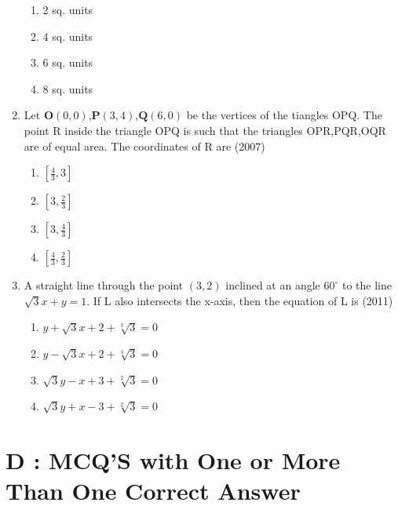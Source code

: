 \documentclass[12pt]{article}
\let\vec\mathbf
\begin{document}
\begin{enumerate}
\begin{enumerate}
\item 2 sq. units  
\item 4 sq. units 
\item 6 sq. units    
\item 8 sq. units
\end{enumerate}
\item Let $\vec{O}(0,0)$,$\vec{P}(3,4)$,$\vec{Q}(6,0)$ be the vertices of the tiangles OPQ. The point R inside the triangle OPQ is such that the triangles OPR,PQR,OQR are of equal area. The coordinates of R are   (2007)
\begin{enumerate}
\item $[\frac{4}{3}, 3]$   
\item $[3,\frac{2}{3}]$  
\item $[3,\frac{4}{3}]$  
\item $[\frac{4}{3},\frac{2}{3}]$
\end{enumerate}
\item A straight line through the point $(3,2)$ inclined at an angle $60^\circ$  to the line $\sqrt{3}x+y=1$. If L also intersects the x-axis, then the equation of L is   (2011)
\begin{enumerate}
\item $y+\sqrt{3}x+2+\sqrt[3]{3}=0$
\item $y-\sqrt{3}x+2+\sqrt[3]{3}=0$ 
\item $\sqrt{3}y-x+3+\sqrt[2]{3}=0$  
\item $\sqrt{3}y+x-3+\sqrt[2]{3}=0$
\end{enumerate}
\end{enumerate}
\section*{D  :  MCQ'S with One or More Than One Correct Answer}
\end{document}

